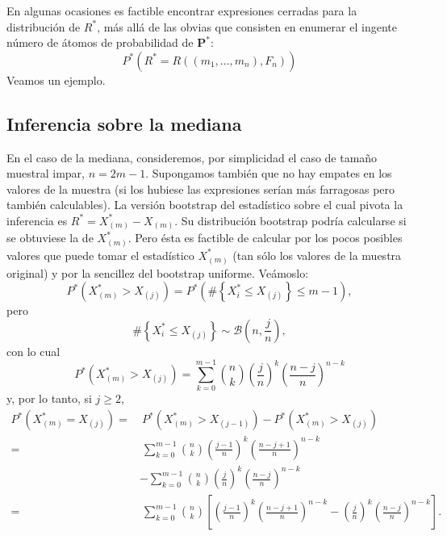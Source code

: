 \documentclass[
]{book}
\theoremstyle{break}
\theoremstyle{definition}
\theoremstyle{definition}
\theoremstyle{definition}
\theoremstyle{definition}
\theoremstyle{remark}
\begin{document}
En algunas ocasiones es factible encontrar expresiones cerradas
para la distribución de \(R^{\ast}\), más allá de las obvias que
consisten en enumerar el ingente número de átomos de probabilidad de
\(\mathbf{P}^{\ast}\):
\[P^{\ast}\left( R^{\ast}=R\left( \left( m_1,\ldots ,m_n \right)
,F_n \right) \right)\]
Veamos un ejemplo.

\hypertarget{inferencia-sobre-la-mediana}{%
\subsection{Inferencia sobre la mediana}\label{inferencia-sobre-la-mediana}}

En el caso de la mediana, consideremos, por simplicidad el caso de
tamaño muestral impar, \(n=2m-1\). Supongamos también que no hay empates
en los valores de la muestra (si los hubiese las expresiones serían más
farragosas pero también calculables). La versión bootstrap del
estadístico sobre el cual pivota la inferencia es \(R^{\ast}=X_{\left( m \right)}^{\ast}-X_{(m)}\). Su distribución bootstrap
podría calcularse si se obtuviese la de \(X_{(m)}^{\ast}\).
Pero ésta es factible de calcular por los pocos posibles valores que
puede tomar el estadístico \(X_{(m)}^{\ast}\) (tan sólo los
valores de la muestra original) y por la sencillez del bootstrap
uniforme.
Veámoslo:
\[P^{\ast}\left( X_{(m)}^{\ast}>X_{(j)} \right)
=P^{\ast}\left( \#\left\{ X_i^{\ast}\leq X_{(j)}\right\}
\leq m-1 \right),\]
pero
\[\#\left\{ X_i^{\ast}\leq X_{(j)}\right\} \sim \mathcal{B}\left(
n,\frac{j}{n} \right),\]
con lo cual
\[P^{\ast}\left( X_{(m)}^{\ast}>X_{(j)} \right)
=\sum_{k=0}^{m-1}\binom{n}{k}\left( \frac{j}{n} \right)^{k}
\left( \frac{n-j}{n} \right)^{n-k}\]
y, por lo tanto, si \(j\geq 2\),
\[\begin{aligned}
P^{\ast}\left( X_{(m)}^{\ast}=X_{(j)} \right)
=&\ P^{\ast}\left( X_{(m)}^{\ast}>X_{\left( j-1 \right)} \right)
-P^{\ast}\left( X_{(m)}^{\ast}>X_{(j)} \right) \\
=&\ \sum_{k=0}^{m-1}\binom{n}{k}\left( \frac{j-1}{n} \right)^{k}\left( \frac{
n-j+1}{n} \right)^{n-k} \\
&-\sum_{k=0}^{m-1}\binom{n}{k}\left( \frac{j}{n} \right)^{k}\left( \frac{n-j}{
n} \right)^{n-k} \\
=&\ \sum_{k=0}^{m-1}\binom{n}{k}\left[ \left( \frac{j-1}{n} \right)^{k}\left( 
\frac{n-j+1}{n} \right)^{n-k}-\left( \frac{j}{n} \right)^{k}\left( \frac{n-j
}{n} \right)^{n-k}\right] .
\end{aligned}\]
\end{document}
